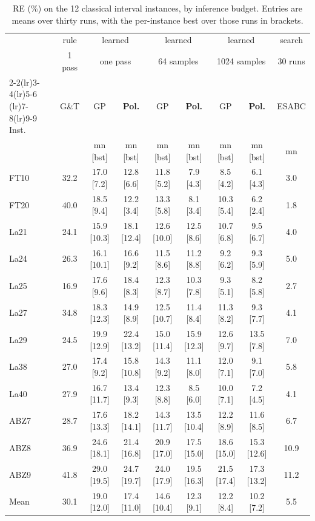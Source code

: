 \documentclass[preprint,authoryear,12pt]{elsarticle}
\theoremstyle{definition}
\theoremstyle{remark}
\begin{document}
\begin{table}[!htb]
\centering\small
\caption{RE (\%) on the 12 classical interval instances, by inference
budget. Entries are means over thirty runs, with the per-instance
best over those runs in brackets.}
\label{tab:classics}
\footnotesize
\setlength{\tabcolsep}{3.5pt}
\begin{tabular}{lcccccccc}
\toprule
& rule & \multicolumn{2}{c}{learned} &
\multicolumn{2}{c}{learned} & \multicolumn{2}{c}{learned} & search \\
& 1 pass & \multicolumn{2}{c}{one pass} &
\multicolumn{2}{c}{64 samples} & \multicolumn{2}{c}{1024 samples} &
30 runs \\
\cmidrule(lr){2-2}\cmidrule(lr){3-4}\cmidrule(lr){5-6}
\cmidrule(lr){7-8}\cmidrule(lr){9-9}
Inst. & G\&T & GP & \textbf{Pol.} & GP & \textbf{Pol.} & GP &
\textbf{Pol.} & ESABC \\
 & & {\scriptsize mn [bst]} & {\scriptsize mn [bst]} &
{\scriptsize mn [bst]} & {\scriptsize mn [bst]} &
{\scriptsize mn [bst]} & {\scriptsize mn [bst]} &
{\scriptsize mn} \\
\midrule
FT10 & 32.2 & 17.0 [7.2] & 12.8 [6.6] & 11.8 [5.2] & 7.9 [4.3] & 8.5 [4.2] & 6.1 [4.3] & 3.0 \\
FT20 & 40.0 & 18.5 [9.4] & 12.2 [3.4] & 13.3 [5.8] & 8.1 [3.4] & 10.3 [5.4] & 6.2 [2.4] & 1.8 \\
La21 & 24.1 & 15.9 [10.3] & 18.1 [12.4] & 12.6 [10.0] & 12.5 [8.6] & 10.7 [6.8] & 9.5 [6.7] & 4.0 \\
La24 & 26.3 & 16.1 [10.1] & 16.6 [9.2] & 11.5 [8.6] & 11.2 [8.8] & 9.2 [6.2] & 9.3 [5.9] & 5.0 \\
La25 & 16.9 & 17.6 [9.6] & 18.4 [8.3] & 12.3 [8.7] & 10.3 [7.8] & 9.3 [5.1] & 8.2 [5.8] & 2.7 \\
La27 & 34.8 & 18.3 [12.3] & 14.9 [8.9] & 12.5 [10.7] & 11.4 [8.4] & 11.3 [8.2] & 9.3 [7.7] & 4.1 \\
La29 & 24.5 & 19.9 [12.9] & 22.4 [13.2] & 15.0 [11.4] & 15.9 [12.3] & 12.6 [9.7] & 13.5 [7.8] & 7.0 \\
La38 & 27.0 & 17.4 [9.2] & 15.8 [10.8] & 14.3 [9.2] & 11.1 [8.0] & 12.0 [7.1] & 9.1 [7.0] & 5.8 \\
La40 & 27.9 & 16.7 [11.7] & 13.4 [9.3] & 12.3 [8.8] & 8.5 [6.0] & 10.0 [7.1] & 7.2 [4.5] & 4.1 \\
ABZ7 & 28.7 & 17.6 [13.3] & 18.2 [14.1] & 14.3 [11.7] & 13.5 [10.4] & 12.2 [8.9] & 11.6 [8.5] & 6.7 \\
ABZ8 & 36.9 & 24.6 [18.1] & 21.4 [16.8] & 20.9 [17.0] & 17.5 [15.0] & 18.6 [15.0] & 15.3 [12.6] & 10.9 \\
ABZ9 & 41.8 & 29.0 [19.5] & 24.7 [19.7] & 24.0 [17.9] & 19.5 [16.3] & 21.5 [17.4] & 17.3 [13.2] & 11.2 \\
\midrule
Mean & 30.1 & 19.0 [12.0] & 17.4 [11.0] & 14.6 [10.4] & 12.3 [9.1] & 12.2 [8.4] & 10.2 [7.2] & 5.5 \\
\bottomrule
\end{tabular}
\end{table}
\end{document}
